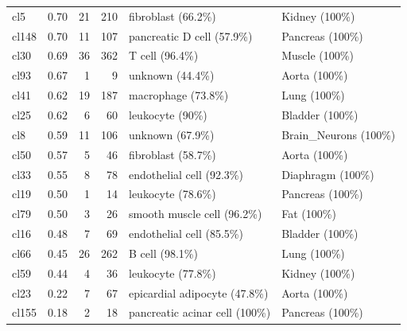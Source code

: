 \begin{table}[ht!]
\begin{tabular}{lrrrll}
  cl5 & 0.70 &  21 & 210 & fibroblast (66.2\%) & Kidney (100\%) \\ 
  cl148 & 0.70 &  11 & 107 & pancreatic D cell (57.9\%) & Pancreas (100\%) \\ 
  cl30 & 0.69 &  36 & 362 & T cell (96.4\%) & Muscle (100\%) \\ 
  cl93 & 0.67 &   1 &   9 & unknown (44.4\%) & Aorta (100\%) \\ 
  cl41 & 0.62 &  19 & 187 & macrophage (73.8\%) & Lung (100\%) \\ 
  cl25 & 0.62 &   6 &  60 & leukocyte (90\%) & Bladder (100\%) \\ 
  cl8 & 0.59 &  11 & 106 & unknown (67.9\%) & Brain\_Neurons (100\%) \\ 
  cl50 & 0.57 &   5 &  46 & fibroblast (58.7\%) & Aorta (100\%) \\ 
  cl33 & 0.55 &   8 &  78 & endothelial cell (92.3\%) & Diaphragm (100\%) \\ 
  cl19 & 0.50 &   1 &  14 & leukocyte (78.6\%) & Pancreas (100\%) \\ 
  cl79 & 0.50 &   3 &  26 & smooth muscle cell (96.2\%) & Fat (100\%) \\ 
  cl16 & 0.48 &   7 &  69 & endothelial cell (85.5\%) & Bladder (100\%) \\ 
  cl66 & 0.45 &  26 & 262 & B cell (98.1\%) & Lung (100\%) \\ 
  cl59 & 0.44 &   4 &  36 & leukocyte (77.8\%) & Kidney (100\%) \\ 
  cl23 & 0.22 &   7 &  67 & epicardial adipocyte (47.8\%) & Aorta (100\%) \\ 
  cl155 & 0.18 &   2 &  18 & pancreatic acinar cell (100\%) & Pancreas (100\%) \\ 
   \bottomrule
\end{tabular}
\end{table}

